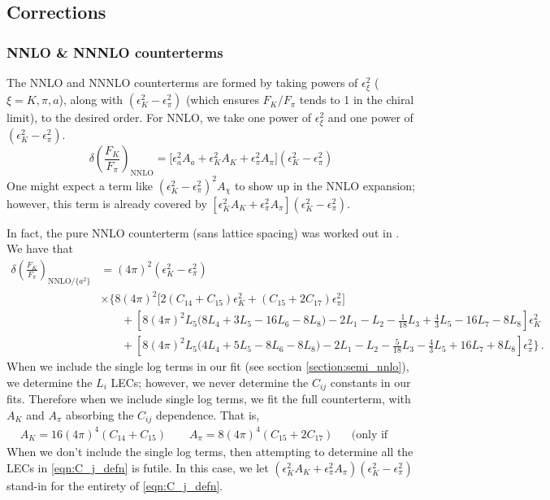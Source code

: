 \documentclass[prd,tightenlines,preprintnumbers,showpacs,superscriptaddress,notitlepage,eqsecnum,floatfix,notitlepage]{revtex4-1}
\begin{document}
\subsection{Corrections}

\subsubsection{NNLO \& NNNLO counterterms} \label{section:nnlo_corrections}
The NNLO and NNNLO counterterms are formed by taking powers of $\epsilon^2_\xi$ ($\xi = K, \pi, a$), along with $(\epsilon_K^2 - \epsilon_\pi^2)$ (which ensures $F_K / F_\pi$ tends to 1 in the chiral limit), to the desired order. For NNLO, we take one power of $\epsilon^2_\xi$ and one power of $(\epsilon_K^2 - \epsilon_\pi^2)$.
\begin{equation}
\delta\left(\frac{F_K}{F_\pi}\right)_\text{NNLO} = \bigg[
\epsilon_a^2  A_{a}
+\epsilon_K^2  A_{K}
+\epsilon_\pi^2  A_{\pi}
\bigg] (\epsilon_K^2 - \epsilon_\pi^2)
\end{equation}
One might expect a term like $(\epsilon_K^2 - \epsilon_\pi^2)^2 A_{\chi}$ to show up in the NNLO expansion; however, this term is already covered by $[\epsilon_K^2  A_{K}+\epsilon_\pi^2  A_{\pi}] (\epsilon_K^2 - \epsilon_\pi^2)$.

In fact, the pure NNLO counterterm (sans lattice spacing) was worked out in  \cite{Ananthanarayan:2017qmx}. We have that
\begin{align} \label{eqn:C_j_defn}
\delta\left(\frac{F_K}{F_\pi}\right)_{\text{NNLO} / \{a^2 \}}
&= (4 \pi)^2 \left(\epsilon_K^2 - \epsilon_\pi^2\right) \\
&\times \Bigg\{ 
8 (4 \pi)^2 \big[ 2 \left(C_{14} + C_{15}\right) \epsilon_K^2 + \left( C_{15} + 2 C_{17} \right) \epsilon_\pi^2 \big] \nonumber \\
&\phantom{= \Bigg\}} +  \left[ 8 (4 \pi)^2 L_5  \big( 8 L_4 + 3L_5 - 16 L_6 -8L_8 \big)
-2 L_1 - L_2 - \frac{1}{18} L_3 + \frac{4}{3} L_5 - 16 L_7 - 8 L_8
\right] \epsilon_K^2 \nonumber \\
&\phantom{= \Bigg\}} +  \left[ 8 (4 \pi)^2  L_5  \big( 4 L_4 + 5 L_5 - 8 L_6 - 8 L_8 \big)
-2 L_1 - L_2 - \frac{5}{18} L_3 - \frac{4}{3} L_5 + 16 L_7 + 8 L_8
\right] \epsilon_\pi^2 \nonumber 
\Bigg\} \, .
\end{align}
When we include the single log terms in our fit (see section \ref{section:semi_nnlo}), we determine the $L_i$ LECs; however, we never determine the $C_{ij}$ constants in our fits. Therefore when we include single log terms, we fit the full counterterm, with $A_K$ and $A_\pi$ absorbing the $C_{ij}$ dependence. That is,
\begin{align}
&A_K = 16 (4 \pi)^4 (C_{14} + C_{15}) \qquad A_\pi = 8 (4 \pi)^4 (C_{15} + 2 C_{17}) &&  \text{(only if including single log terms)}
\end{align}
When we don't include the single log terms, then attempting to determine all the LECs in \eqref{eqn:C_j_defn} is futile. In this case, we let $(\epsilon_K^2  A_{K} +\epsilon_\pi^2  A_{\pi}) (\epsilon_K^2 - \epsilon_\pi^2)$ stand-in for the entirety of \eqref{eqn:C_j_defn}.
\end{document}
